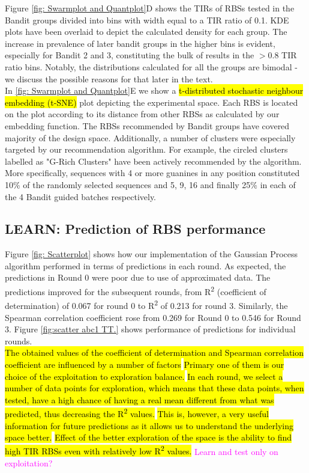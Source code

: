 \documentclass{article}
\newcommand{\mengyan}[1]{\textcolor{magenta}{#1}}
\begin{document}
Figure \ref{fig: Swarmplot and Quantplot}D shows the TIRs of RBSs tested in the Bandit groups divided into bins with width equal to a TIR ratio of 0.1.
KDE plots have been overlaid to depict the calculated density for each group.
The increase in prevalence of later bandit groups in the higher bins is evident, especially for Bandit 2 and 3, constituting the bulk of results in the $>0.8$ TIR ratio bins.
Notably, the distributions calculated for all the groups are bimodal - we discuss the possible reasons for that later in the text.\\

In \ref{fig: Swarmplot and Quantplot}E we show a \hl{t-distributed stochastic neighbour embedding (t-SNE)} plot depicting the experimental space.
Each RBS is located on the plot according to its distance from other RBSs as calculated by our embedding function.
The RBSs recommended by Bandit groups have covered majority of the design space. 
Additionally, a number of clusters were especially targeted by our recommendation algorithm.
For example, the circled clusters labelled as "G-Rich Clusters" have been actively recommended by the algorithm.
More specifically, sequences with 4 or more guanines in any position constituted 10\% of the randomly selected sequences and 5, 9, 16 and finally 25\% in each of the 4 Bandit guided batches respectively.

\subsection{LEARN: Prediction of RBS performance}
\label{sec:gp-results}

Figure \ref{fig: Scatterplot} shows how our implementation of the Gaussian Process algorithm performed in terms of predictions in each round. 
As expected, the predictions in Round 0 were poor due to use of approximated data. 
The predictions improved for the subsequent rounds, from R\textsuperscript{2} (coefficient of determination) of 0.067 for round 0 to R\textsuperscript{2} of 0.213 for round 3.
Similarly, the Spearman correlation coefficient rose from 0.269 for Round 0 to 0.546 for Round 3.
Figure \ref{fig:scatter abc1 TT.} shows performance of predictions for individual rounds.\\

\hl{The obtained values of the coefficient of determination and Spearman correlation coefficient are influenced by a number of factors}
\hl{Primary one of them is our choice of the exploitation to exploration balance.}
\hl{In each round, we select a number of data points for exploration, which means that these data points, when tested, have a high chance of having a real mean different from what was predicted, thus decreasing the R\textsuperscript{2} values.}
\hl{This is, however, a very useful information for future predictions as it allows us to understand the underlying space better.}
\hl{Effect of the better exploration of the space is the ability to find high TIR RBSs even with relatively low R\textsuperscript{2} values.}
\mengyan{Learn and test only on exploitation?}\\
\end{document}
